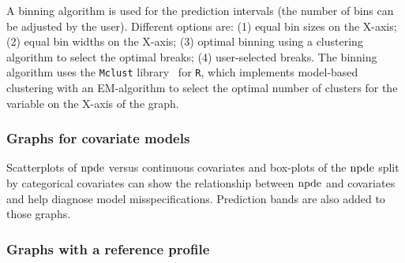 A binning algorithm is used for the prediction intervals (the number of bins can be adjusted by the user). Different options are: (1) equal bin sizes on the X-axis; (2) equal bin widths on the X-axis; (3) optimal binning using a clustering algorithm to select the optimal breaks; (4) user-selected breaks. The binning algorithm uses the \texttt{Mclust} library~\cite{Fraley02,Fraley06} for \texttt{R}, which implements model-based clustering with an EM-algorithm to select the optimal number of clusters for the variable on the X-axis of the graph.

\subsubsection{Graphs for covariate models} 

\hskip 18pt Scatterplots of ${\rm npde}$ versus continuous covariates and box-plots of the ${\rm npde}$ split by categorical covariates can show the relationship between ${\rm npde}$ and covariates and help diagnose model misspecifications. Prediction bands are also added to those graphs.

\subsubsection{Graphs with a reference profile}

\hskip 18pt 

